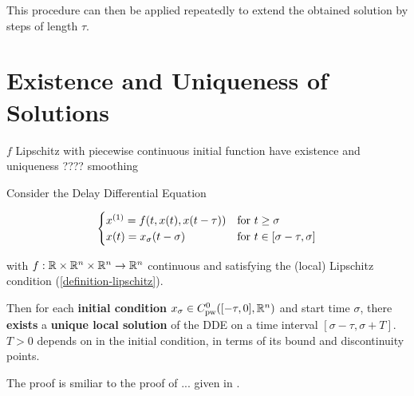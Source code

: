 This procedure can then be applied repeatedly to extend the obtained solution by steps of length $\tau$.

\section{Existence and Uniqueness of Solutions} \label{existence-and-uniqueness-of-solutions}

$f$ Lipschitz with piecewise continuous initial function have existence and uniqueness ???? smoothing

\begin{theorem}
    \label{theorem-solution-existence}
    Consider the Delay Differential Equation



    \begin{equation}
        \begin{cases}
            \D{x} = f(t,x(t),x(t-\tau)) & \text{for } t\geq\sigma\\
            x(t) = x_\sigma(t-\sigma)     & \text{for } t\in [\sigma-\tau,\sigma]
        \end{cases}
    \end{equation}

    with $f:\mathbb{R}\times\mathbb{R}^n\times\mathbb{R}^n\rightarrow\mathbb{R}^n$ continuous and satisfying the (local) Lipschitz condition (\ref{definition-lipschitz}).

    Then for each \textbf{initial condition} $x_\sigma\in\statespace[\tau]$ and start time $\sigma$, there \textbf{exists} a \textbf{unique local solution} of the DDE on a time interval $[\sigma-\tau, \sigma+T]$. $T>0$ depends on in the initial condition, in terms of its bound and discontinuity points.
\end{theorem}
The proof is smiliar to the proof of ... given in \cite{Smith10IntroDDE}.
